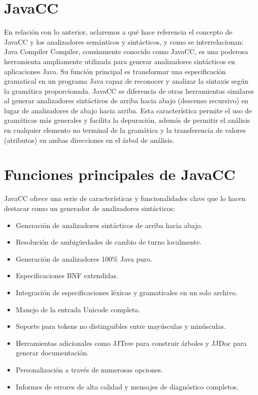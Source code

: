 \section{JavaCC}
En relación con lo anterior, aclaremos a qué hace referencia el concepto de JavaCC y los analizadores semánticos y sintácticos, y como se interrelacionan:
Java Compiler Compiler, comúnmente conocido como JavaCC, es una poderosa herramienta ampliamente utilizada para generar analizadores sintácticos en aplicaciones Java. Su función principal es transformar una especificación gramatical en un programa Java capaz de reconocer y analizar la sintaxis según la gramática proporcionada.
JavaCC se diferencia de otras herramientas similares al generar analizadores sintácticos de arriba hacia abajo (descenso recursivo) en lugar de analizadores de abajo hacia arriba. Esta característica permite el uso de gramáticas más generales y facilita la depuración, además de permitir el análisis en cualquier elemento no terminal de la gramática y la transferencia de valores (atributos) en ambas direcciones en el árbol de análisis.

\section{Funciones principales de JavaCC}
JavaCC ofrece una serie de características y funcionalidades clave que lo hacen destacar como un generador de analizadores sintácticos:
\begin{itemize}
	\item Generación de analizadores sintácticos de arriba hacia abajo.
	\item Resolución de ambigüedades de cambio de turno localmente.
	\item Generación de analizadores 100\% Java puro.
	\item Especificaciones BNF extendidas.
	\item Integración de especificaciones léxicas y gramaticales en un solo archivo.
	\item Manejo de la entrada Unicode completa.
	\item Soporte para tokens no distinguibles entre mayúsculas y minúsculas.
	\item Herramientas adicionales como JJTree para construir árboles y JJDoc para generar documentación.
	\item Personalización a través de numerosas opciones.
	\item Informes de errores de alta calidad y mensajes de diagnóstico completos.
\end{itemize}

